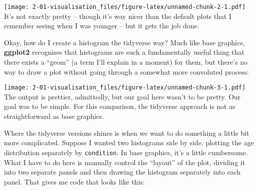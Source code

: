 \documentclass[]{book}
\newenvironment{Shaded}{\begin{snugshade}}{\end{snugshade}}
\newcommand{\DataTypeTok}[1]{\textcolor[rgb]{0.13,0.29,0.53}{#1}}
\newcommand{\DecValTok}[1]{\textcolor[rgb]{0.00,0.00,0.81}{#1}}
\newcommand{\KeywordTok}[1]{\textcolor[rgb]{0.13,0.29,0.53}{\textbf{#1}}}
\newcommand{\NormalTok}[1]{#1}
\newcommand{\OperatorTok}[1]{\textcolor[rgb]{0.81,0.36,0.00}{\textbf{#1}}}
\newcommand{\StringTok}[1]{\textcolor[rgb]{0.31,0.60,0.02}{#1}}
\begin{document}
\texttt{[image: 2-01-visualisation\_files/figure-latex/unnamed-chunk-2-1.pdf]}
It's not exactly pretty -- though it's way nicer than the default plots that I remember seeing when I was younger -- but it gets the job done.

Okay, how do I create a histogram the tidyverse way? Much like base graphics, \textbf{ggplot2} recognises that histograms are such a fundamentally useful thing that there exists a ``geom'' (a term I'll explain in a moment) for them, but there's no way to draw a plot without going through a somewhat more convoluted process:

\begin{Shaded}
\end{Shaded}

\texttt{[image: 2-01-visualisation\_files/figure-latex/unnamed-chunk-3-1.pdf]}
The output is prettier, admittedly, but our goal here wasn't to be pretty. Our goal was to be simple. For this comparison, the tidyverse approach is not as straightforward as base graphics.

Where the tidyverse versions shines is when we want to do something a little bit more complicated. Suppose I wanted two histograms side by side, plotting the age distribution separately by \texttt{condition}. In base graphics, it's a little cumbersome. What I have to do here is manually control the ``layout'' of the plot, dividing it into two separate panels and then drawing the histogram separately into each panel. That gives me code that looks like this:

\begin{Shaded}
\end{Shaded}
\end{document}
